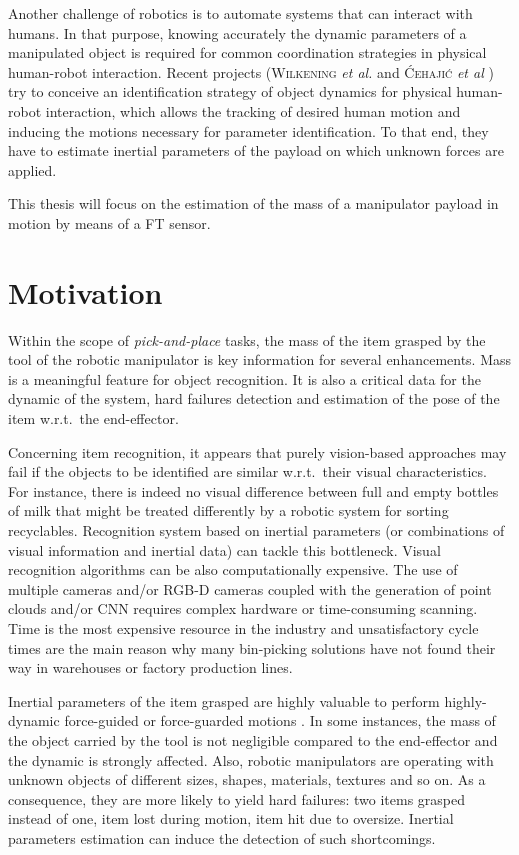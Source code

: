 \documentclass[/home/francois/latex/report/main.tex]{subfiles}
\begin{document}
Another challenge of robotics is to automate systems that can interact with humans. In that purpose, knowing accurately the dynamic parameters of a manipulated object is required for common coordination strategies in physical human-robot interaction. Recent projects (\textsc{Wilkening} \textit{et al.} \cite{Wilkening2016} and \textsc{Ćehajić} \textit{et al} \cite{Ćehajić2017}) try to conceive an identification strategy of object dynamics for physical human-robot interaction, which allows the tracking of desired human motion and inducing the motions necessary for parameter identification. To that end, they have to estimate inertial parameters of the payload on which unknown forces are applied.

This thesis will focus on the estimation of the mass of a manipulator payload in motion by means of a \ac{FT} sensor.

\section{Motivation}

Within the scope of \textit{pick-and-place} tasks, the mass of the item grasped by the tool of the robotic manipulator is key information for several enhancements. Mass is a meaningful feature for object recognition. It is also a critical data for the dynamic of the system, hard failures detection and estimation of the pose of the item w.r.t.\ the end-effector.

Concerning item recognition, it appears that purely vision-based approaches may fail if the objects to be identified are similar w.r.t.\ their visual characteristics. For instance, there is indeed no visual difference between full and empty bottles of milk that might be treated differently by a robotic system for sorting recyclables. Recognition system based on inertial parameters (or combinations of visual information and inertial data) can tackle this bottleneck.
Visual recognition algorithms can be also computationally expensive. The use of multiple cameras and/or RGB-D cameras coupled with the generation of point clouds and/or \ac{CNN} requires complex hardware or time-consuming scanning. Time is the most expensive resource in the industry and unsatisfactory cycle times are the main reason why many bin-picking solutions have not found their way in warehouses or factory production lines.

Inertial parameters of the item grasped are highly valuable to perform highly-dynamic force-guided or force-guarded motions \cite{Garcia2006, KubusKroger2008}. In some instances, the mass of the object carried by the tool is not negligible compared to the end-effector and the dynamic is strongly affected.
Also, robotic manipulators are operating with unknown objects of different sizes, shapes, materials, textures and so on. As a consequence, they are more likely to yield hard failures: two items grasped instead of one, item lost during motion, item hit due to oversize. Inertial parameters estimation can induce the detection of such shortcomings.
\end{document}

